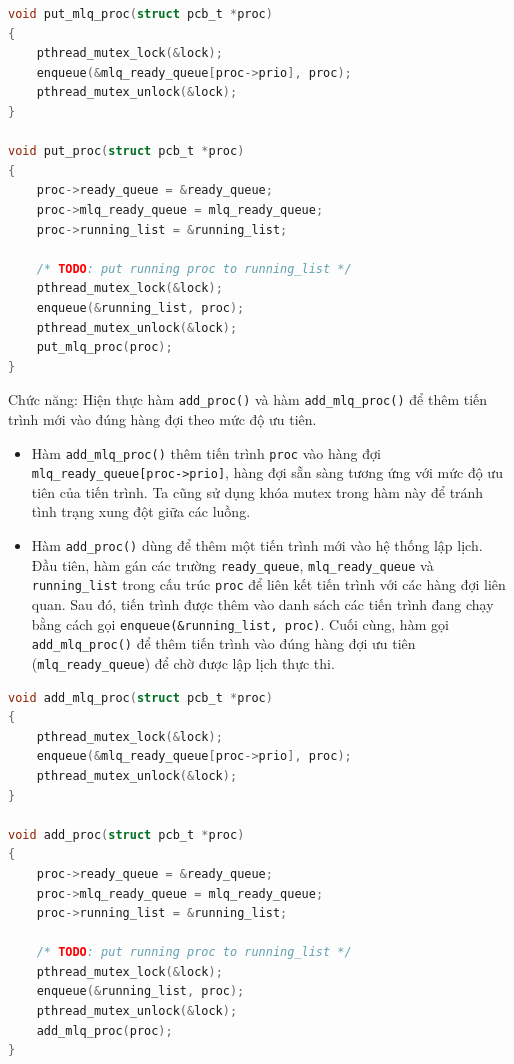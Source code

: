 \begin{lstlisting}[style=Cstyle,language=C]
void put_mlq_proc(struct pcb_t *proc)
{
    pthread_mutex_lock(&lock);
    enqueue(&mlq_ready_queue[proc->prio], proc);
    pthread_mutex_unlock(&lock);
}

void put_proc(struct pcb_t *proc)
{
    proc->ready_queue = &ready_queue;
    proc->mlq_ready_queue = mlq_ready_queue;
    proc->running_list = &running_list;

    /* TODO: put running proc to running_list */
    pthread_mutex_lock(&lock);
    enqueue(&running_list, proc);
    pthread_mutex_unlock(&lock);
    put_mlq_proc(proc);
}
\end{lstlisting}




Chức năng: Hiện thực hàm \texttt{add\_proc()} và hàm \texttt{add\_mlq\_proc()} để thêm tiến trình mới vào đúng hàng đợi theo mức độ ưu tiên.

\begin{itemize}
    \item Hàm \texttt{add\_mlq\_proc()} thêm tiến trình \texttt{proc} vào hàng đợi \texttt{mlq\_ready\_queue[proc->prio]}, hàng đợi sẵn sàng tương ứng với mức độ ưu tiên của tiến trình. Ta cũng sử dụng khóa mutex trong hàm này để tránh tình trạng xung đột giữa các luồng.
    \item Hàm \texttt{add\_proc()} dùng để thêm một tiến trình mới vào hệ thống lập lịch. Đầu tiên, hàm gán các trường \texttt{ready\_queue}, \texttt{mlq\_ready\_queue} và \texttt{running\_list} trong cấu trúc \texttt{proc} để liên kết tiến trình với các hàng đợi liên quan. Sau đó, tiến trình được thêm vào danh sách các tiến trình đang chạy bằng cách gọi \texttt{enqueue(\&running\_list, proc)}. Cuối cùng, hàm gọi \texttt{add\_mlq\_proc()} để thêm tiến trình vào đúng hàng đợi ưu tiên (\texttt{mlq\_ready\_queue}) để chờ được lập lịch thực thi.
\end{itemize}

\begin{lstlisting}[style=Cstyle,language=C]
void add_mlq_proc(struct pcb_t *proc)
{
    pthread_mutex_lock(&lock);
    enqueue(&mlq_ready_queue[proc->prio], proc);
    pthread_mutex_unlock(&lock);
}

void add_proc(struct pcb_t *proc)
{
    proc->ready_queue = &ready_queue;
    proc->mlq_ready_queue = mlq_ready_queue;
    proc->running_list = &running_list;

    /* TODO: put running proc to running_list */
    pthread_mutex_lock(&lock);
    enqueue(&running_list, proc);
    pthread_mutex_unlock(&lock);
    add_mlq_proc(proc);
}
\end{lstlisting}





